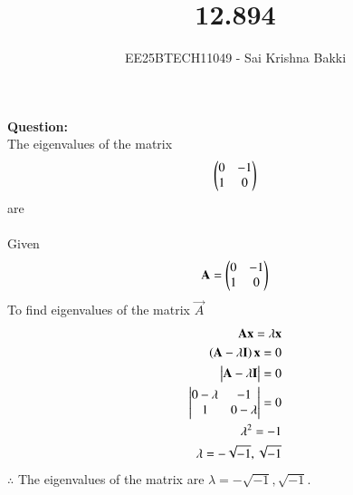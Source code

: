 \documentclass[journal]{IEEEtran}
\begin{document}

\vspace{3cm}

\title{12.894}
\author{EE25BTECH11049 - Sai Krishna Bakki}
\maketitle
\vspace{-3em}
\textbf{Question:}\\
The eigenvalues of the matrix 
\begin{align*}
\begin{pmatrix}0&-1\\1&0\end{pmatrix}
\end{align*}
are\\
\solution\\
Given\\
\begin{align}
    \mathbf{A}=\begin{pmatrix}0&-1\\1&0\end{pmatrix}
\end{align}
To find eigenvalues of the matrix $\vec{A}$
\begin{align}
    \mathbf{A}\mathbf{x}=\lambda\mathbf{x}\\
    \left(\mathbf{A}-\lambda\mathbf{I}\right)\mathbf{x}=0\\
    \begin{vmatrix}\mathbf{A}-\lambda\mathbf{I}\end{vmatrix}=0\\
    \begin{vmatrix}0-\lambda&-1\\1&0-\lambda\end{vmatrix}=0\\
    \lambda^2=-1\\
    \lambda=-\sqrt{-1},\sqrt{-1}
    \end{align}
    $\therefore$ The eigenvalues of the matrix are $\lambda=-\sqrt{-1},\sqrt{-1}$.
\end{document}

